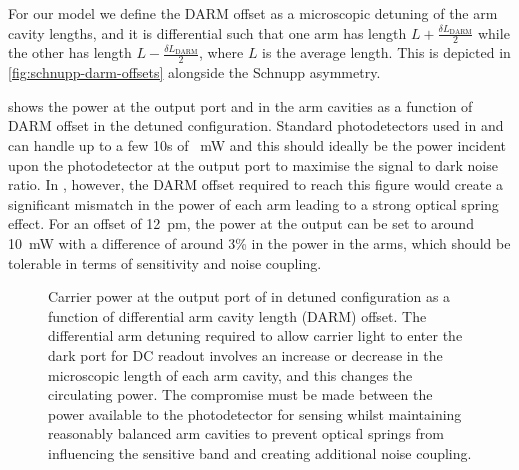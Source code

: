 For our model we define the \gls{DARM} offset as a microscopic detuning of the arm cavity lengths, and it is differential such that one arm has length $L + \frac{\delta L_{\text{DARM}}}{2}$ while the other has length $L - \frac{\delta L_{\text{DARM}}}{2}$, where $L$ is the average length. This is depicted in \cref{fig:schnupp-darm-offsets} alongside the Schnupp asymmetry.

 shows the power at the output port and in the arm cavities as a function of \gls{DARM} offset in the detuned configuration. Standard photodetectors used in \ALIGO{} and \AVIRGO{} can handle up to a few \num{10}s of \SI{}{\milli\watt} and this should ideally be the power incident upon the photodetector at the output port to maximise the signal to dark noise ratio. In \ETLF{}, however, the \gls{DARM} offset required to reach this figure would create a significant mismatch in the power of each arm leading to a strong optical spring effect. For an offset of \SI{12}{\pico\meter}, the power at the output can be set to around \SI{10}{\milli\watt} with a difference of around 3\% in the power in the arms, which should be tolerable in terms of sensitivity and noise coupling.

\begin{figure}
  \centering
  
  \caption[Carrier power at the output port of \ETLF{} in detuned configuration as a function of differential arm cavity offset]{\label{fig:total-power-vs-darm-offset-detuned}Carrier power at the output port of \ETLF{} in detuned configuration as a function of differential arm cavity length (\gls{DARM}) offset. The differential arm detuning required to allow carrier light to enter the dark port for \gls{DC} readout involves an increase or decrease in the microscopic length of each arm cavity, and this changes the circulating power. The compromise must be made between the power available to the photodetector for sensing whilst maintaining reasonably balanced arm cavities to prevent optical springs from influencing the sensitive band and creating additional noise coupling.}
\end{figure}


